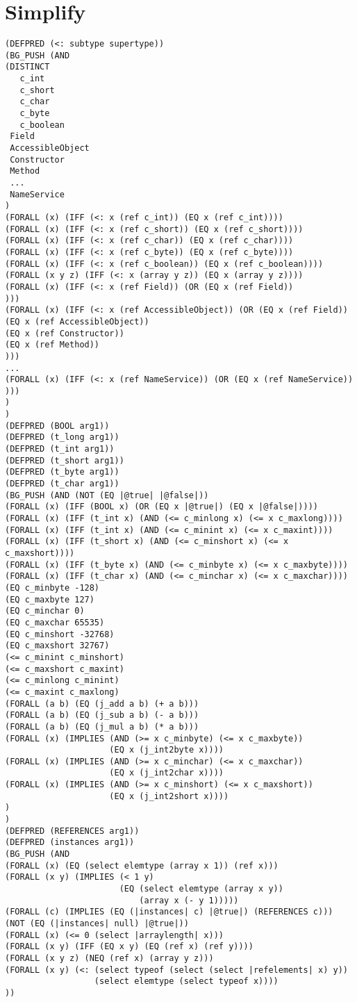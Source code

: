 \section{Simplify}
\begin{verbatim}
(DEFPRED (<: subtype supertype))
(BG_PUSH (AND
(DISTINCT 
   c_int
   c_short
   c_char
   c_byte
   c_boolean
 Field
 AccessibleObject
 Constructor
 Method
 ...
 NameService
)
(FORALL (x) (IFF (<: x (ref c_int)) (EQ x (ref c_int))))
(FORALL (x) (IFF (<: x (ref c_short)) (EQ x (ref c_short))))
(FORALL (x) (IFF (<: x (ref c_char)) (EQ x (ref c_char))))
(FORALL (x) (IFF (<: x (ref c_byte)) (EQ x (ref c_byte))))
(FORALL (x) (IFF (<: x (ref c_boolean)) (EQ x (ref c_boolean))))
(FORALL (x y z) (IFF (<: x (array y z)) (EQ x (array y z))))
(FORALL (x) (IFF (<: x (ref Field)) (OR (EQ x (ref Field))
)))
(FORALL (x) (IFF (<: x (ref AccessibleObject)) (OR (EQ x (ref Field))
(EQ x (ref AccessibleObject))
(EQ x (ref Constructor))
(EQ x (ref Method))
)))
...
(FORALL (x) (IFF (<: x (ref NameService)) (OR (EQ x (ref NameService))
)))
)
)
(DEFPRED (BOOL arg1))
(DEFPRED (t_long arg1))
(DEFPRED (t_int arg1))
(DEFPRED (t_short arg1))
(DEFPRED (t_byte arg1))
(DEFPRED (t_char arg1))
(BG_PUSH (AND (NOT (EQ |@true| |@false|))
(FORALL (x) (IFF (BOOL x) (OR (EQ x |@true|) (EQ x |@false|))))
(FORALL (x) (IFF (t_int x) (AND (<= c_minlong x) (<= x c_maxlong))))
(FORALL (x) (IFF (t_int x) (AND (<= c_minint x) (<= x c_maxint))))
(FORALL (x) (IFF (t_short x) (AND (<= c_minshort x) (<= x c_maxshort))))
(FORALL (x) (IFF (t_byte x) (AND (<= c_minbyte x) (<= x c_maxbyte))))
(FORALL (x) (IFF (t_char x) (AND (<= c_minchar x) (<= x c_maxchar))))
(EQ c_minbyte -128) 
(EQ c_maxbyte 127) 
(EQ c_minchar 0) 
(EQ c_maxchar 65535) 
(EQ c_minshort -32768) 
(EQ c_maxshort 32767)
(<= c_minint c_minshort) 
(<= c_maxshort c_maxint) 
(<= c_minlong c_minint) 
(<= c_maxint c_maxlong)
(FORALL (a b) (EQ (j_add a b) (+ a b))) 
(FORALL (a b) (EQ (j_sub a b) (- a b))) 
(FORALL (a b) (EQ (j_mul a b) (* a b)))
(FORALL (x) (IMPLIES (AND (>= x c_minbyte) (<= x c_maxbyte)) 
                     (EQ x (j_int2byte x))))
(FORALL (x) (IMPLIES (AND (>= x c_minchar) (<= x c_maxchar)) 
                     (EQ x (j_int2char x))))
(FORALL (x) (IMPLIES (AND (>= x c_minshort) (<= x c_maxshort)) 
                     (EQ x (j_int2short x))))
)
)
(DEFPRED (REFERENCES arg1))
(DEFPRED (instances arg1))
(BG_PUSH (AND
(FORALL (x) (EQ (select elemtype (array x 1)) (ref x)))
(FORALL (x y) (IMPLIES (< 1 y) 
                       (EQ (select elemtype (array x y)) 
                           (array x (- y 1)))))
(FORALL (c) (IMPLIES (EQ (|instances| c) |@true|) (REFERENCES c)))
(NOT (EQ (|instances| null) |@true|))
(FORALL (x) (<= 0 (select |arraylength| x)))
(FORALL (x y) (IFF (EQ x y) (EQ (ref x) (ref y))))
(FORALL (x y z) (NEQ (ref x) (array y z)))
(FORALL (x y) (<: (select typeof (select (select |refelements| x) y)) 
                  (select elemtype (select typeof x))))
)) 

\end{verbatim}
